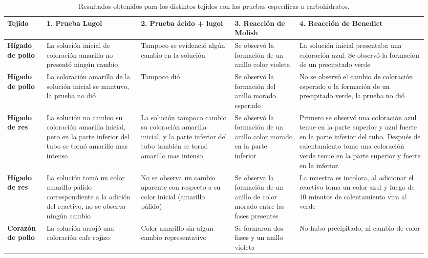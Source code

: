 \begin{table*}[h!]
	\small
	\caption{Resultados obtenidos para los distintos tejidos con las pruebas espec\'ificas a carbohidratos.}
	\label{tb: carbohidratos}
	\begin{tabular}{p{1.5cm}|p{3.5cm}p{3.5cm}p{3.5cm}p{3.5cm}}
		\hline
		\textbf{Tejido} & \textbf{1. Prueba Lugol} & \textbf{2. Prueba ácido + lugol} & \textbf{3. Reacción de Molish} & \textbf{4. Reacción de Benedict}
		\\
		\hline
		\textbf{H\'igado de pollo} & La solución inicial de coloración amarilla no presentó ningún cambio & Tampoco se evidenció algún cambio en la solución & Se observó la formación de un anillo color violeta & La solución inicial presentaba una coloración azul. Se observó la formación de un precipitado verde
		\\
		\hline
		\textbf{H\'igado de pollo} & La coloración amarilla de la solución inicial se mantuvo, la prueba no dió & Tampoco dió & Se observó la formación del anillo morado esperado & No se observó el cambio de coloración esperado o la formación de un precipitado verde, la prueba no dió
		\\
		\hline
		
		\textbf{H\'igado de res} & La solución no cambio su coloración amarilla inicial, pero en la parte inferior del tubo se tornó amarillo mas intenso & La solución tampoco cambio su coloración amarilla inicial, y la parte inferior del tubo tambi\'en se tornó amarillo mas intenso	& Se observó la formaci\'on de un anillo color morado en la parte inferior & Primero se observó una coloraci\'on azul tenue en la parte superior y azul fuerte en la parte inferior del tubo. Despu\'es de calentamiento tomo una coloraci\'on verde tenue en la parte superior y fuerte en la inferior.
		\\
		\hline
		
		\textbf{H\'igado de res} & La solución tomó un color amarillo pálido correspondiente a la adición del reactivo, no se observa ningún cambio & No se observa un cambio aparente con respecto a su color inicial (amarillo pálido) & Se observa la formación de un anillo de color morado entre las fases presentes & La muestra es incolora, al adicionar el reactivo toma un color azul y luego de 10 minutos de calentamiento vira al verde
		\\
		\hline
		
		\textbf{Coraz\'on de pollo} & La solución arrojó una coloración cafe rojizo & Color amarillo sin algun cambio representativo & Se formaron dos fases y un anillo violeta & No hubo precipitado, ni cambio de color
		\\
		\hline
		

\end{tabular}
\end{table*}

